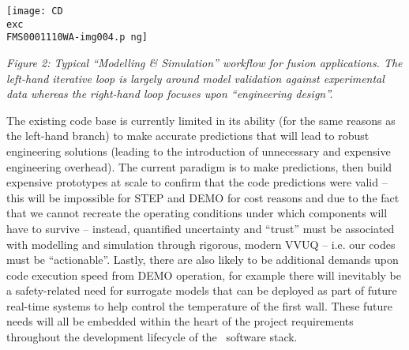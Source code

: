 \documentclass[a4paper]{article}
\begin{document}
\bigskip

{\centering  
\texttt{[image: CD\\exc \\ FMS0001110WA-img004.p
ng]} \par}

\bigskip

\textit{Figure 2: Typical ``Modelling \& Simulation'' workflow for fusion 
applications. The left-hand iterative loop is
largely around model validation against experimental data whereas the 
right-hand loop focuses upon ``engineering
design''.}


\bigskip

The existing code base is currently limited in its ability (for the same 
reasons as the left-hand branch) to make
accurate predictions that will lead to robust engineering solutions (leading to 
the introduction of unnecessary and
expensive engineering overhead). The current paradigm is to make predictions, 
then build expensive prototypes at scale
to confirm that the code predictions were valid -- this will be impossible for 
STEP and DEMO for cost reasons and due
to the fact that we cannot recreate the operating conditions under which 
components will have to survive -- instead,
quantified uncertainty and ``trust'' must be associated with modelling and 
simulation through rigorous, modern VVUQ --
i.e. our codes must be ``actionable''. Lastly, there are also likely to be 
additional demands upon code execution speed
from DEMO operation, for example there will inevitably be a safety-related need 
for surrogate models that can be
deployed as part of future real-time systems to help control the temperature of 
the first wall. These future needs will
all be embedded within the heart of the project requirements throughout the 
development lifecycle of the \nep \ 
software stack. 


\bigskip
\end{document}

